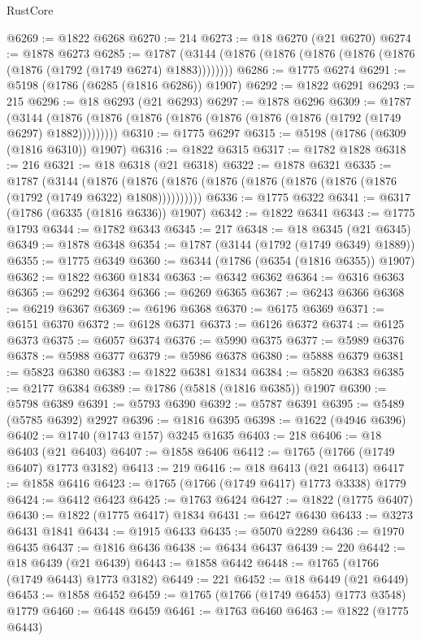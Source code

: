 \begin{lexlean}{RustCore}
\begin{coremodule}
@6269 := @1822 @6268
@6270 := 214
@6273 := @18 @6270 (@21 @6270)
@6274 := @1878 @6273
@6285 := @1787 (@3144 (@1876 (@1876 (@1876 (@1876 (@1876 (@1876 (@1792 (@1749 @6274) @1883))))))))
@6286 := @1775 @6274
@6291 := @5198 (@1786 (@6285 (@1816 @6286)) @1907)
@6292 := @1822 @6291
@6293 := 215
@6296 := @18 @6293 (@21 @6293)
@6297 := @1878 @6296
@6309 := @1787
    (@3144 (@1876 (@1876 (@1876 (@1876 (@1876 (@1876 (@1876 (@1792 (@1749 @6297) @1882)))))))))
@6310 := @1775 @6297
@6315 := @5198 (@1786 (@6309 (@1816 @6310)) @1907)
@6316 := @1822 @6315
@6317 := @1782 @1828
@6318 := 216
@6321 := @18 @6318 (@21 @6318)
@6322 := @1878 @6321
@6335 := @1787
    (@3144
      (@1876 (@1876 (@1876 (@1876 (@1876 (@1876 (@1876 (@1876 (@1792 (@1749 @6322) @1808))))))))))
@6336 := @1775 @6322
@6341 := @6317 (@1786 (@6335 (@1816 @6336)) @1907)
@6342 := @1822 @6341
@6343 := @1775 @1793
@6344 := @1782 @6343
@6345 := 217
@6348 := @18 @6345 (@21 @6345)
@6349 := @1878 @6348
@6354 := @1787 (@3144 (@1792 (@1749 @6349) @1889))
@6355 := @1775 @6349
@6360 := @6344 (@1786 (@6354 (@1816 @6355)) @1907)
@6362 := @1822 @6360 @1834
@6363 := @6342 @6362
@6364 := @6316 @6363
@6365 := @6292 @6364
@6366 := @6269 @6365
@6367 := @6243 @6366
@6368 := @6219 @6367
@6369 := @6196 @6368
@6370 := @6175 @6369
@6371 := @6151 @6370
@6372 := @6128 @6371
@6373 := @6126 @6372
@6374 := @6125 @6373
@6375 := @6057 @6374
@6376 := @5990 @6375
@6377 := @5989 @6376
@6378 := @5988 @6377
@6379 := @5986 @6378
@6380 := @5888 @6379
@6381 := @5823 @6380
@6383 := @1822 @6381 @1834
@6384 := @5820 @6383
@6385 := @2177 @6384
@6389 := @1786 (@5818 (@1816 @6385)) @1907
@6390 := @5798 @6389
@6391 := @5793 @6390
@6392 := @5787 @6391
@6395 := @5489 (@5785 @6392) @2927
@6396 := @1816 @6395
@6398 := @1622 (@4946 @6396)
@6402 := @1740 (@1743 @157) @3245 @1635
@6403 := 218
@6406 := @18 @6403 (@21 @6403)
@6407 := @1858 @6406
@6412 := @1765 (@1766 (@1749 @6407) @1773 @3182)
@6413 := 219
@6416 := @18 @6413 (@21 @6413)
@6417 := @1858 @6416
@6423 := @1765 (@1766 (@1749 @6417) @1773 @3338) @1779
@6424 := @6412 @6423
@6425 := @1763 @6424
@6427 := @1822 (@1775 @6407)
@6430 := @1822 (@1775 @6417) @1834
@6431 := @6427 @6430
@6433 := @3273 @6431 @1841
@6434 := @1915 @6433
@6435 := @5070 @2289
@6436 := @1970 @6435
@6437 := @1816 @6436
@6438 := @6434 @6437
@6439 := 220
@6442 := @18 @6439 (@21 @6439)
@6443 := @1858 @6442
@6448 := @1765 (@1766 (@1749 @6443) @1773 @3182)
@6449 := 221
@6452 := @18 @6449 (@21 @6449)
@6453 := @1858 @6452
@6459 := @1765 (@1766 (@1749 @6453) @1773 @3548) @1779
@6460 := @6448 @6459
@6461 := @1763 @6460
@6463 := @1822 (@1775 @6443)

\end{coremodule}
\end{lexlean}
